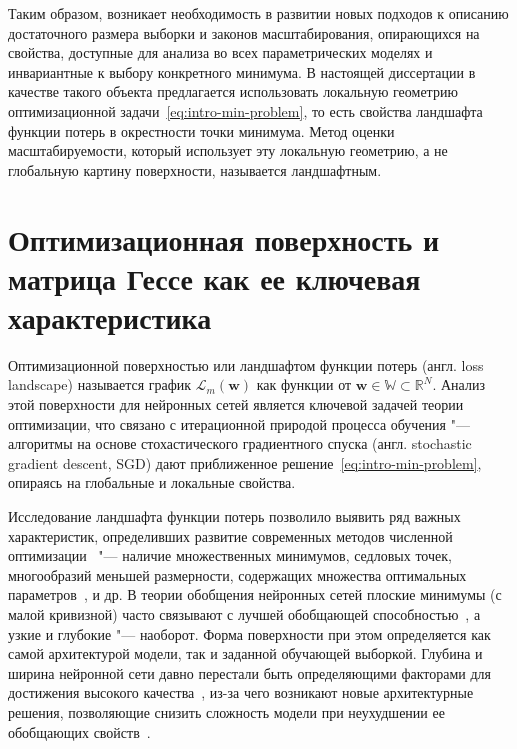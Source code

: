 Таким образом, возникает необходимость в развитии новых подходов к описанию достаточного размера выборки и законов масштабирования, опирающихся на свойства, доступные для анализа во всех параметрических моделях и инвариантные к выбору конкретного минимума. В настоящей диссертации в качестве такого объекта предлагается использовать локальную геометрию оптимизационной задачи~\eqref{eq:intro-min-problem}, то есть свойства ландшафта функции потерь в окрестности точки минимума. Метод оценки масштабируемости, который использует эту локальную геометрию, а не глобальную картину поверхности, называется ландшафтным.

\section{Оптимизационная поверхность и матрица Гессе как ее ключевая характеристика}

Оптимизационной поверхностью или ландшафтом функции потерь (англ. loss landscape) называется график $\mathcal{L}_m(\mathbf{w})$ как функции от $\mathbf{w} \in \mathbb{W} \subset \mathbb{R}^N$. Анализ этой поверхности для нейронных сетей является ключевой задачей теории оптимизации, что связано с итерационной природой процесса обучения "--- алгоритмы на основе стохастического градиентного спуска (англ. stochastic gradient descent, SGD) дают приближенное решение~\eqref{eq:intro-min-problem}, опираясь на глобальные и локальные свойства.

Исследование ландшафта функции потерь позволило выявить ряд важных характеристик, определивших развитие современных методов численной оптимизации~\cite{kingma2015adam,chaudhari2019,foret2021sam} "--- наличие множественных минимумов, седловых точек, многообразий меньшей размерности, содержащих множества оптимальных параметров~\cite{draxler2018essentially,garipov2018loss}, и др. В теории обобщения нейронных сетей плоские минимумы (с малой кривизной) часто связывают с лучшей обобщающей способностью~\cite{chaudhari2019,keskar2017largebatch,foret2021sam}, а узкие и глубокие "--- наоборот. Форма поверхности при этом определяется как самой архитектурой модели, так и заданной обучающей выборкой. Глубина и ширина нейронной сети давно перестали быть определяющими факторами для достижения высокого качества~\cite{he2016resnet}, из-за чего возникают новые архитектурные решения, позволяющие снизить сложность модели при неухудшении ее обобщающих свойств~\cite{ioffe2015batchnorm,ba2016layernorm,ulyanov2016instancenorm,wu2018groupnorm,srivastava2014dropout,henry2020qknorm}.

